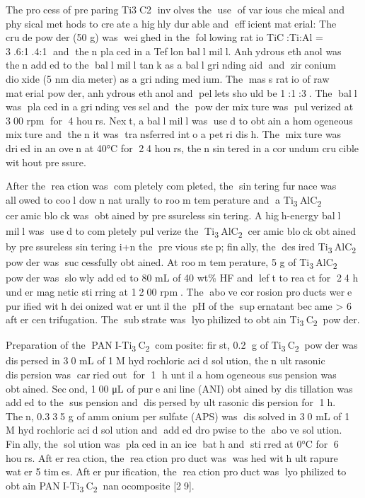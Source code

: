 {The process of preparing Ti3C2 involves the use of various
chemical and physical methods to create a highly durable and
efficient material: The crude powder (50 g) was weighed in the
following ratio TiC:Ti:Al = 3.6:1.4:1 and then placed in a
Teflon ball mill. Anhydrous ethanol was then added to the ball
mill tank as a ball grinding aid and zirconium dioxide (5 nm
diameter) as a grinding medium. The mass ratio of raw material
powder, anhydrous ethanol and pellets should be 1:1:3. The
ball was placed in a grinding vessel and the powder mixture
was pulverized at 300 rpm for 4 hours. Next, a ball mill was
used to obtain a homogeneous mixture and then it was transferred
into a petri dish. The mixture was dried in an oven at 40°C for
24 hours, then sintered in a corundum crucible without pressure.

After the reaction was completely completed, the sintering
furnace was allowed to cool down naturally to room temperature
and a Ti\textsubscript{3}AlC\textsubscript{2}
cer\textsubscript{}amic block was obtained by pressureless
sintering. A high-energy ball mill was used to completely
pulverize the Ti\textsubscript{3}AlC\textsubscript{2} ceramic
block obtained by pressureless sintering i+n the previous step;
finally, the desired Ti\textsubscript{3}AlC\textsubscript{2}
powder was successfully obtained. At room temperature, 5 g of
Ti\textsubscript{3}AlC\textsubscript{2} powder was slowly added to
80 mL of 40 wt\% HF and left to react for 24 h under magnetic
stirring at 1200 rpm. The above corrosion products were
purified with deionized water until the pH of the supernatant
became \textgreater{} 6 after centrifugation. The substrate was
lyophilized to obtain Ti\textsubscript{3}C\textsubscript{2} powder.

Preparation of the PANI-Ti\textsubscript{3}C\textsubscript{2}
composite: first, 0.2 g of Ti\textsubscript{3}C\textsubscript{2}
powder was dispersed in 30 mL of 1M hydrochloric acid solution,
then ultrasonic dispersion was carried out for 1 h until a
homogeneous suspension was obtained. Second, 100 μL of pure
aniline (ANI) obtained by distillation was added to the
suspension and dispersed by ultrasonic dispersion for 1h. Then,
0.335 g of ammonium persulfate (APS) was dissolved in 30 mL of 1
M hydrochloric acid solution and added dropwise to the above
solution. Finally, the solution was placed in an ice bath and
stirred at 0°C for 6 hours. After reaction, the reaction product
was washed with ultrapure water 5 times. After purification,
the reaction product was lyophilized to obtain
PANI-Ti\textsubscript{3}C\textsubscript{2} nanocomposite {[}29{]}.

}
